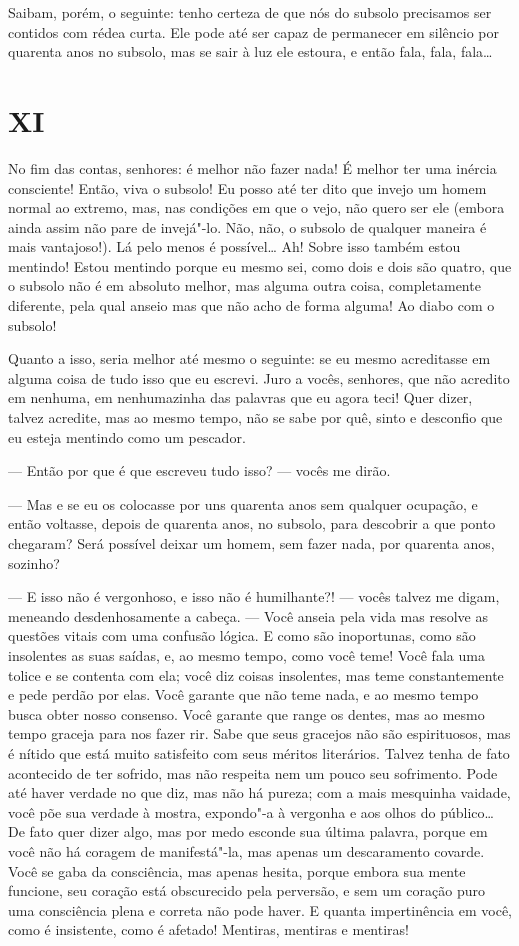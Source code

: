 Saibam, porém, o seguinte: tenho certeza de que nós do subsolo
precisamos ser contidos com rédea curta. Ele pode até ser capaz de
permanecer em silêncio por quarenta anos no subsolo, mas se sair à luz
ele estoura, e então fala, fala, fala\ldots{}


\section{XI}

No fim das contas, senhores: é melhor não fazer nada! É melhor ter uma
inércia consciente! Então, viva o subsolo! Eu posso até ter dito que
invejo um homem normal ao extremo, mas, nas condições em que o vejo,
não quero ser ele (embora ainda assim não pare de invejá"-lo. Não, não,
o subsolo de qualquer maneira é mais vantajoso!). Lá pelo menos é
possível\ldots{} Ah! Sobre isso também estou mentindo! Estou mentindo porque
eu mesmo sei, como dois e dois são quatro, que o subsolo não é em
absoluto melhor, mas alguma outra coisa, completamente diferente, pela
qual anseio mas que não acho de forma alguma! Ao diabo com o subsolo!

Quanto a isso, seria melhor até mesmo o seguinte: se eu mesmo
acreditasse em alguma coisa de tudo isso que eu escrevi. Juro a vocês,
senhores, que não acredito em nenhuma, em nenhumazinha das palavras que
eu agora teci! Quer dizer, talvez acredite, mas ao mesmo tempo, não se
sabe por quê, sinto e desconfio que eu esteja mentindo como um
pescador.

--- Então por que é que escreveu tudo isso? --- vocês me dirão.

--- Mas e se eu os colocasse por uns quarenta anos sem qualquer ocupação,
e então voltasse, depois de quarenta anos, no subsolo, para descobrir a
que ponto chegaram? Será possível deixar um homem, sem fazer nada, por
quarenta anos, sozinho?

--- E isso não é vergonhoso, e isso não é humilhante?! --- vocês talvez me
digam, meneando desdenhosamente a cabeça. --- Você anseia pela vida mas
resolve as questões vitais com uma confusão lógica. E como são
inoportunas, como são insolentes as suas saídas, e, ao mesmo tempo,
como você teme! Você fala uma tolice e se contenta com ela; você diz
coisas insolentes, mas teme constantemente e pede perdão por elas. Você
garante que não teme nada, e ao mesmo tempo busca obter nosso consenso.
Você garante que range os dentes, mas ao mesmo tempo graceja para nos
fazer rir. Sabe que seus gracejos não são espirituosos, mas é nítido
que está muito satisfeito com seus méritos literários. Talvez tenha de
fato acontecido de ter sofrido, mas não respeita nem um pouco seu
sofrimento. Pode até haver verdade no que diz, mas não há pureza; com a
mais mesquinha vaidade, você põe sua verdade à mostra, expondo"-a à
vergonha e aos olhos do público\ldots{} De fato quer dizer algo, mas por
medo esconde sua última palavra, porque em você não há coragem de
manifestá"-la, mas apenas um descaramento covarde. Você se gaba da
consciência, mas apenas hesita, porque embora sua mente funcione, seu
coração está obscurecido pela perversão, e sem um coração puro uma
consciência plena e correta não pode haver. E quanta impertinência em
você, como é insistente, como é afetado! Mentiras, mentiras e mentiras!

